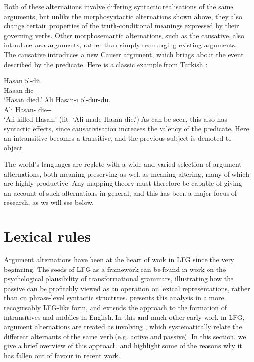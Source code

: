 \documentclass[output=paper]{langscibook}
\begin{document}
\largerpage
\ea%
%
%
\z%
\z

Both of these alternations involve differing syntactic realisations of the same
arguments, but unlike the morphosyntactic alternations shown above, they also
change certain properties of the truth-conditional meanings expressed by their
governing verbs. Other morphosemantic alternations, such as the causative, also
introduce \emph{new} arguments, rather than simply rearranging existing
arguments. The causative introduces a new Causer argument, which brings about
the event described by the predicate. Here is a classic example from Turkish
\citep[5]{comrie:causatives}:

\ea%
\ea%
\gll Hasan \"ol-d\"u.\\
Hasan die-\PST\\
\glt `Hasan died.'%
\ex%
\gll Ali Hasan-\i{} \"ol-d\"ur-d\"u.\\
Ali Hasan-\OBJ{} die-\CAUS-\PST\\
\glt `Ali killed Hasan.' (lit. `Ali made Hasan die.')%
\z%
\z
%
As can be seen, this also has syntactic effects, since causativisation increases
the valency of the predicate. Here an intransitive becomes a transitive, and the
previous subject is demoted to object.

The world's languages are replete with a wide and varied selection of argument
alternations, both meaning-preserving as well as meaning-altering, many of which are
highly productive. Any mapping theory must therefore be capable of giving an
account of such alternations in general, and this has been a major focus of
research, as we will see below.

\section{Lexical rules}\label{sec:argstr:lexical-rules}

Argument alternations have been at the heart of work in LFG since the very
beginning. The seeds of LFG as a framework can be found in
 work on the psychological plausibility of
transformational grammars, illustrating how the passive can be profitably viewed
as an operation on lexical representations, rather than on phrase-level
syntactic structures. \citet{bresnan:polyadicity} presents this analysis in a
more recognisably LFG-like form, and extends the approach to the formation of
intransitives and middles in English. In this and much other early work in LFG,
argument alternations are treated as involving , which
systematically relate the different alternants of the same verb (e.g. active and
passive). In this section, we give a brief overview of this approach, and
highlight some of the reasons why it has fallen out of favour in recent work.
\end{document}
